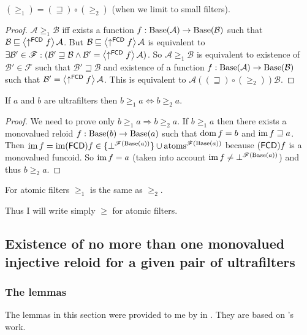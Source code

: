 \begin{prop}
$(\ge_{1})=(\sqsupseteq)\circ(\ge_{2})$ (when we limit to small filters).\end{prop}
\begin{proof}
$\mathcal{A}\ge_{1}\mathcal{B}$ iff exists a function $f:\operatorname{Base}(\mathcal{A})\rightarrow\operatorname{Base}(\mathcal{B})$
such that $\mathcal{B}\sqsubseteq\left\langle \uparrow^{\mathsf{FCD}}f\right\rangle\mathcal{A}$.
But $\mathcal{B}\sqsubseteq\left\langle \uparrow^{\mathsf{FCD}}f\right\rangle\mathcal{A}$
is equivalent to $\exists\mathcal{B}'\in\mathscr{F}:(\mathcal{B}'\sqsupseteq\mathcal{B}\land\mathcal{B}'=\left\langle \uparrow^{\mathsf{FCD}}f\right\rangle\mathcal{A})$.
So $\mathcal{A}\ge_{1}\mathcal{B}$ is equivalent to existence of
$\mathcal{B}'\in\mathscr{F}$ such that $\mathcal{B}'\sqsupseteq\mathcal{B}$
and existence of a function $f:\operatorname{Base}(\mathcal{A})\rightarrow\operatorname{Base}(\mathcal{B})$
such that $\mathcal{B}'=\left\langle \uparrow^{\mathsf{FCD}}f\right\rangle\mathcal{A}$.
This is equivalent to $\mathcal{A}\mathrel{((\sqsupseteq)\circ(\ge_{2}))}\mathcal{B}$.\end{proof}
\begin{prop}
If $a$ and $b$ are ultrafilters then $b\ge_{1}a\Leftrightarrow b\ge_{2}a$.\end{prop}
\begin{proof}
We need to prove only $b\ge_{1}a\Rightarrow b\ge_{2}a$. If $b\ge_{1}a$
then there exists a monovalued reloid $f:\operatorname{Base}(b)\rightarrow\operatorname{Base}(a)$
such that $\operatorname{dom} f=b$ and $\operatorname{im} f\sqsupseteq a$. Then $\operatorname{im} f=\operatorname{im}(\mathsf{FCD}) f\in\{\bot^{\mathscr{F}(\operatorname{Base}(a))}\}\cup\operatorname{atoms}^{\mathscr{F}(\operatorname{Base}(a))}$
because $(\mathsf{FCD}) f$ is a monovalued funcoid. So $\operatorname{im} f=a$ (taken
into account $\operatorname{im} f\ne\bot^{\mathscr{F}(\operatorname{Base}(a))}$) and thus $b\ge_{2}a$\@.\end{proof}
\begin{cor}
For atomic filters $\ge_{1}$ is the same as $\ge_{2}$.
\end{cor}
Thus I will write simply $\ge$ for atomic filters.


\subsection{Existence of no more than one monovalued injective reloid for a given
pair of ultrafilters}


\subsubsection{The lemmas}

The lemmas in this section were provided to me by 
in \cite{solovay-on-identity}. They are based on 's
work.

